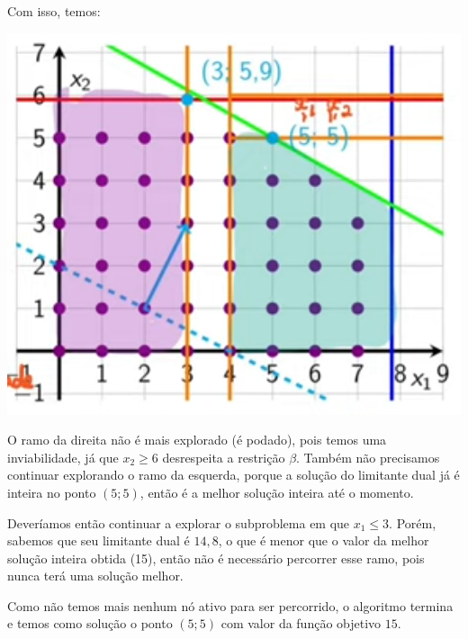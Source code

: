Com isso, temos:

\begin{multicols}{2}

    \null \vfill
    \begin{center}
    \end{center}
    \vfill \null

    \columnbreak

    \includegraphics[width=.45\textwidth]{img/ex_branch_bound_3.png}
\end{multicols}

O ramo da direita não é mais explorado (é podado), pois temos uma inviabilidade, já que $x_2\geq6$ desrespeita a restrição $\beta$. Também não precisamos continuar explorando o ramo da esquerda, porque a solução do limitante dual já é inteira no ponto $(5; 5)$, então é a melhor solução inteira até o momento.

Deveríamos então continuar a explorar o subproblema em que $x_1\leq3$. Porém, sabemos que seu limitante dual é $14,8$, o que é menor que o valor da melhor solução inteira obtida (15), então não é necessário percorrer esse ramo, pois nunca terá uma solução melhor.

Como não temos mais nenhum nó ativo para ser percorrido, o algoritmo termina e temos como solução o ponto $(5; 5)$ com valor da função objetivo $15$.

